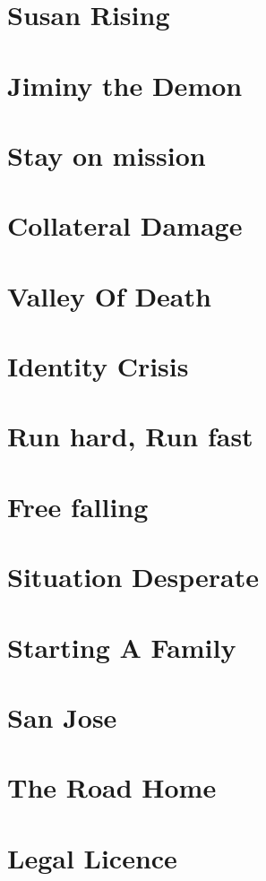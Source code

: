 \chapter{Susan Rising}

\chapter{Jiminy the Demon}

\chapter{Stay on mission}

\chapter{Collateral Damage}

\chapter{Valley Of Death}

\chapter{Identity Crisis}

\chapter{Run hard, Run fast}

\chapter{Free falling}

\chapter{Situation Desperate}

\chapter{Starting A Family}

\chapter{San Jose}

\chapter{The Road Home}

\chapter{Legal Licence}

